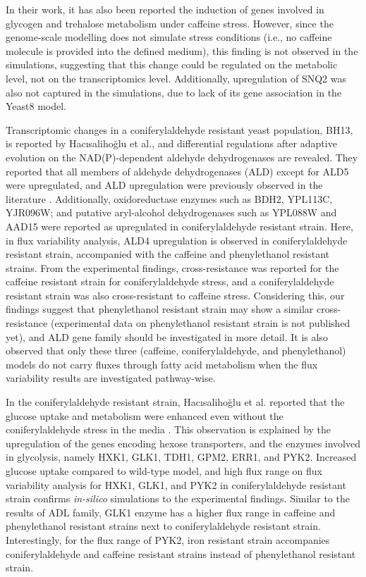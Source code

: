 In their work, it has also been reported the induction of genes involved in glycogen and trehalose metabolism under caffeine stress. However, since the genome-scale modelling does not simulate stress conditions (i.e., no caffeine molecule is provided into the defined medium), this finding is not observed in the simulations, suggesting that this change could be regulated on the metabolic level, not on the transcriptomics level. Additionally, upregulation of SNQ2 was also not captured in the simulations, due to lack of its gene association in the Yeast8 model.

Transcriptomic changes in a coniferylaldehyde resistant yeast population, BH13, is reported by Hacısalihoğlu et al., and differential regulations after adaptive evolution on the NAD(P)-dependent aldehyde dehydrogenases are revealed. They reported that all members of aldehyde dehydrogenases (ALD) except for ALD5 were upregulated, and ALD upregulation were previously observed in the literature \cite{adeboye2015catabolism}. Additionally, oxidoreductase enzymes such as BDH2, YPL113C, YJR096W; and putative aryl-alcohol dehydrogenases such as YPL088W and AAD15 were reported as upregulated in coniferylaldehyde resistant strain. Here, in flux variability analysis, ALD4 upregulation is observed in coniferylaldehyde resistant strain, accompanied with the caffeine and phenylethanol resistant strains. From the experimental findings, cross-resistance was reported for the caffeine resistant strain for coniferylaldehyde stress, and a coniferylaldehyde resistant strain was also cross-resistant to caffeine stress. Considering this, our findings suggest that phenylethanol resistant strain may show a similar cross-resistance (experimental data on phenylethanol resistant strain is not published yet), and ALD gene family should be investigated in more detail. It is also observed that only these three (caffeine, coniferylaldehyde, and phenylethanol) models do not carry fluxes through fatty acid metabolism when the flux variability results are investigated pathway-wise.

In the coniferylaldehyde resistant strain, Hacısalihoğlu et al. reported that the glucose uptake and metabolism were enhanced even without the coniferylaldehyde stress in the media \cite{Hacsaliholu2019}. This observation is explained by the upregulation of the genes encoding hexose transporters, and the enzymes involved in glycolysis, namely HXK1, GLK1, TDH1, GPM2, ERR1, and PYK2. Increased glucose uptake compared to wild-type model, and high flux range on flux variability analysis for HXK1, GLK1, and PYK2 in coniferylaldehyde resistant strain confirms \emph{in-silico} simulations to the experimental findings. Similar to the results of ADL family, GLK1 enzyme has a higher flux range in caffeine and phenylethanol resistant strains next to coniferylaldehyde resistant strain. Interestingly, for the flux range of PYK2, iron resistant strain accompanies coniferylaldehyde and caffeine resistant strains instead of phenylethanol resistant strain.


